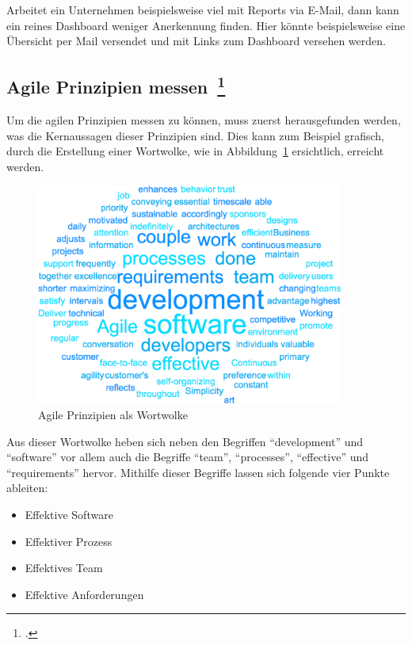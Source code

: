 Arbeitet ein Unternehmen beispielsweise viel mit Reports via E-Mail, dann kann ein reines Dashboard weniger Anerkennung finden. Hier könnte beispielsweise eine Übersicht per Mail versendet und mit Links zum Dashboard versehen werden.

\subsection[Agile Prinzipien messen]{Agile Prinzipien messen~\footcite[vgl.][S.201ff]{davis_agile_2015}}

Um die agilen Prinzipien messen zu können, muss zuerst herausgefunden werden, was die Kernaussagen dieser Prinzipien sind.
Dies kann zum Beispiel grafisch, durch die Erstellung einer Wortwolke, wie in Abbildung~\ref{fig:wordcloud_principles} ersichtlich, erreicht werden.

\begin{savenotes}
  \begin{figure}[H] 
    \centering
    \includegraphics[width=0.9\textwidth]{img/principles-wordcloud.png}
    \caption{Agile Prinzipien als Wortwolke}\label{fig:wordcloud_principles}
  \end{figure}
\end{savenotes}

Aus dieser Wortwolke heben sich neben den Begriffen ``development'' und ``software'' vor allem auch die Begriffe ``team'', ``processes'', ``effective'' und ``requirements'' hervor.
Mithilfe dieser Begriffe lassen sich folgende vier Punkte ableiten:

\begin{itemize}[noitemsep]
  \item Effektive Software
  \item Effektiver Prozess
  \item Effektives Team 
  \item Effektive Anforderungen 
\end{itemize}

